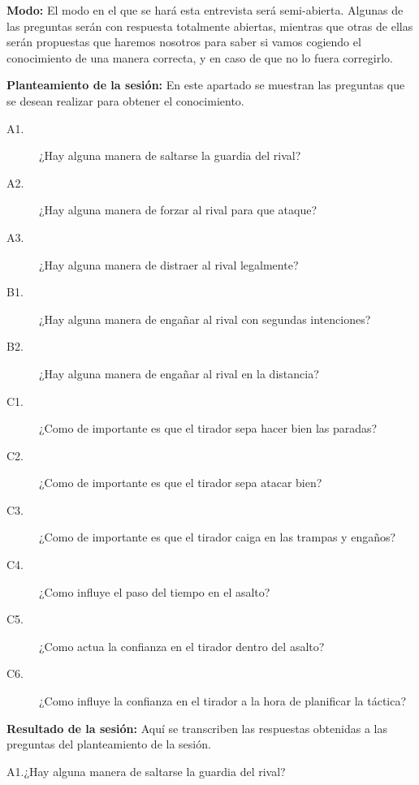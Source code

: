 \textbf{Modo:} El modo en el que se hará esta entrevista será semi-abierta. Algunas de las preguntas
serán con respuesta totalmente abiertas, mientras que otras de ellas serán propuestas que haremos
nosotros para saber si vamos cogiendo el conocimiento de una manera correcta, y en caso de que no lo fuera
corregirlo.

\textbf{Planteamiento de la sesión:} En este apartado se muestran las preguntas que se desean
 realizar para obtener el conocimiento.

\begin{description}
  \item [A1.] ¿Hay alguna manera de saltarse la guardia del rival?
  \item [A2.] ¿Hay alguna manera de forzar al rival para que ataque?
  \item [A3.] ¿Hay alguna manera de distraer al rival legalmente?
\end{description}

\begin{description}
  \item [B1.] ¿Hay alguna manera de engañar al rival con segundas intenciones?
  \item [B2.] ¿Hay alguna manera de engañar al rival en la distancia?
\end{description}

\begin{description}
  \item [C1.] ¿Como de importante es que el tirador sepa hacer bien las paradas?
  \item [C2.] ¿Como de importante es que el tirador sepa atacar bien?
  \item [C3.] ¿Como de importante es que el tirador caiga en las trampas y engaños?
  \item [C4.] ¿Como influye el paso del tiempo en el asalto?
  \item [C5.] ¿Como actua la confianza en el tirador dentro del asalto?
  \item [C6.] ¿Como influye la confianza en el tirador a la hora de planificar la táctica?
\end{description}

\textbf{Resultado de la sesión:} Aquí se transcriben las respuestas obtenidas a las preguntas
 del planteamiento de la sesión.


A1.¿Hay alguna manera de saltarse la guardia del rival?

